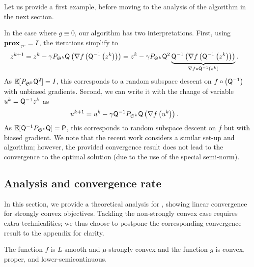 Let us provide a first example, before moving to the analysis of the algorithm in the next section. 

\begin{example}
In the case where $g\equiv0$, our algorithm has two interpretations. 
First, using\;$\mathbf{prox}_{\gamma r} = I$, the iterations simplify to 
\begin{align*}
     z^{k+1} &= z^k - \gamma P_{\mathfrak{S}^k}{\mathsf{Q}}\left(\nabla f\left({\mathsf{Q}}^{-1}\left(z^k\right)\right)\right) = z^k - \gamma  P_{\mathfrak{S}^k}{\mathsf{Q}}^2 \underbrace{{\mathsf{Q}}^{-1}  \left(\nabla f\left({\mathsf{Q}}^{-1}\left(z^k\right)\right)\right) }_{\nabla f\circ {\mathsf{Q}}^{-1} (z^k)}.
\end{align*}
As $\mathbb{E}[P_{\mathfrak{S}^k}{\mathsf{Q}}^2] = I $, this corresponds to a random subspace descent on {$ f\circ \left({\mathsf{Q}}^{-1}\right)$} with unbiased gradients. Second, we can write it with the change of variable $u^k ={\mathsf{Q}}^{-1} z^k $ as
\begin{align*}
  u^{k+1} &= u^k - \gamma  {\mathsf{Q}}^{-1}  P_{\mathfrak{S}^k} {\mathsf{Q}}\left(\nabla f\left(u^k\right)\right).
\end{align*}
As $\mathbb{E} [{\mathsf{Q}}^{-1}  P_{\mathfrak{S}^k}{\mathsf{Q}}] = {\mathsf{P}} $, this corresponds to random subspace descent on $ f $ but with biased gradient. We note that the recent work \cite{frongillo2015convergence} considers a similar set-up and algorithm; however, the provided convergence result does not lead to the convergence to the optimal solution (due to the use of the special semi-norm).\hfill
\end{example}



\subsection{Analysis and convergence rate}\label{sec:conv}

In this section, we provide a theoretical analysis for \algo, showing linear convergence for strongly convex objectives. Tackling the non-strongly convex case requires extra-technicalities; we thus choose to postpone the corresponding convergence result to the appendix for clarity. 



\begin{assumption}\label{hyp:f}
The function $f$ is $L$-smooth and $\mu$-strongly convex and the function $g$ is convex, proper, and lower-semicontinuous.
\end{assumption}


